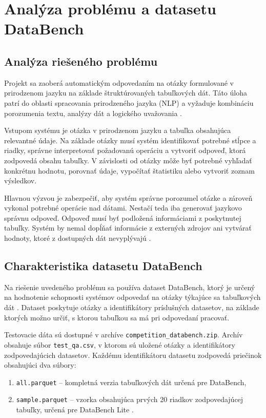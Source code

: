 \section{Analýza problému a datasetu DataBench}

\subsection{Analýza riešeného problému}

Projekt sa zaoberá automatickým odpovedaním na otázky formulované v prirodzenom jazyku na základe štruktúrovaných tabuľkových dát. Táto úloha patrí do oblasti spracovania prirodzeného jazyka (NLP) a vyžaduje kombináciu porozumenia textu, analýzy dát a logického uvažovania \cite{semeval}.

Vstupom systému je otázka v prirodzenom jazyku a tabuľka obsahujúca relevantné údaje. Na základe otázky musí systém identifikovať potrebné stĺpce a riadky, správne interpretovať požadovanú operáciu a vytvoriť odpoveď, ktorá zodpovedá obsahu tabuľky. V závislosti od otázky môže byť potrebné vyhľadať konkrétnu hodnotu, porovnať údaje, vypočítať štatistiku alebo vytvoriť zoznam výsledkov.

Hlavnou výzvou je zabezpečiť, aby systém správne porozumel otázke a zároveň vykonal potrebné operácie nad dátami. Nestačí teda iba generovať jazykovo správnu odpoveď. Odpoveď musí byť podložená informáciami z poskytnutej tabuľky. Systém by nemal dopĺňať informácie z externých zdrojov ani vytvárať hodnoty, ktoré z dostupných dát nevyplývajú \cite{semeval}.

\subsection{Charakteristika datasetu DataBench}

Na riešenie uvedeného problému sa používa dataset DataBench, ktorý je určený na hodnotenie schopnosti systémov odpovedať na otázky týkajúce sa tabuľkových dát \cite{semeval,hfdatabench}. Dataset poskytuje otázky a identifikátory príslušných datasetov, na základe ktorých možno určiť, s ktorou tabuľkou sa má pri odpovedaní pracovať.

Testovacie dáta sú dostupné v archíve \texttt{competition\_databench.zip}. Archív obsahuje súbor \texttt{test\_qa.csv}, v ktorom sú uložené otázky a identifikátory zodpovedajúcich datasetov. Každému identifikátoru datasetu zodpovedá priečinok obsahujúci dva súbory:
\begin{enumerate}
    \item \texttt{all.parquet} -- kompletná verzia tabuľkových dát určená pre DataBench,
    \item \texttt{sample.parquet} -- vzorka obsahujúca prvých 20 riadkov zodpovedajúcej tabuľky, určená pre DataBench Lite \cite{hfdatabench}.
\end{enumerate}

